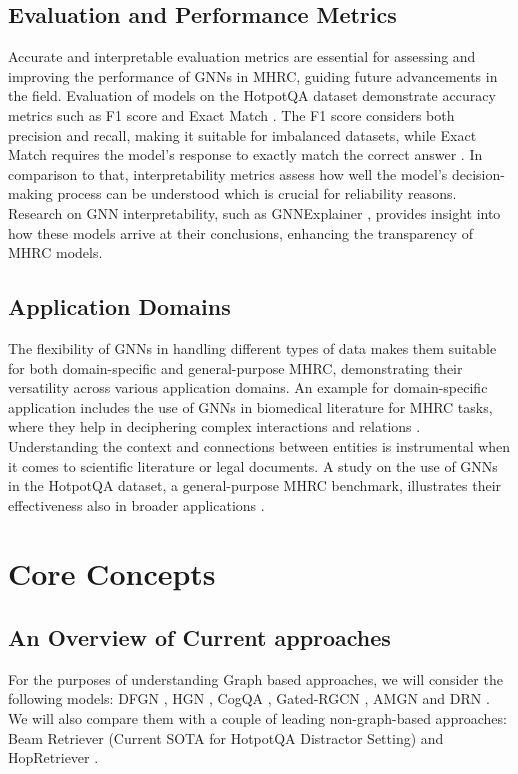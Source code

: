 \documentclass[sigplan,screen,nonacm]{acmart}
\begin{document}
\subsection{Evaluation and Performance Metrics}
Accurate and interpretable evaluation metrics are essential for assessing and improving the performance of GNNs in MHRC, guiding future advancements in the field.
Evaluation of models on the HotpotQA dataset demonstrate accuracy metrics such as F1 score and Exact Match \cite{RN116}. The F1 score considers both precision 
and recall, making it suitable for imbalanced datasets, while Exact Match requires the model's response to exactly match the correct answer \cite{RN116}.
In comparison to that, interpretability metrics assess how well the model's decision-making process can be understood which is crucial for reliability reasons.
Research on GNN interpretability, such as GNNExplainer \cite{RN213}, provides insight into how these models arrive at their conclusions, enhancing the transparency of MHRC models.

\subsection{Application Domains}
The flexibility of GNNs in handling different types of data makes them suitable for both domain-specific and general-purpose MHRC, 
demonstrating their versatility across various application domains. An example for domain-specific application includes the use of GNNs in biomedical literature for MHRC tasks, 
where they help in deciphering complex interactions and relations \cite{RN129}. Understanding the context and connections between entities is instrumental 
when it comes to scientific literature or legal documents. A study on the use of GNNs in the HotpotQA dataset, a general-purpose MHRC benchmark, 
illustrates their effectiveness also in broader applications \cite{RN116}.

\section{Core Concepts}
\subsection{An Overview of Current approaches}
For the purposes of understanding Graph based approaches, we will consider the following models:
DFGN \cite{RN122}, HGN \cite{RN119}, CogQA \cite{RN118}, Gated-RGCN \cite{RN91}, AMGN \cite{RN131} and DRN \cite{RN142}. We will also compare 
them with a couple of leading non-graph-based approaches: Beam Retriever \cite{RN105} (Current SOTA for HotpotQA Distractor Setting) and
HopRetriever \cite{RN149}.
\end{document}
